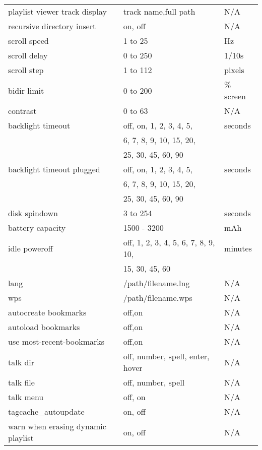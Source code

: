 \begin{center}
\begin{longtable}{@{}lll@{}}
    playlist viewer track display & track name,full path & N/A\\
    recursive directory insert & on, off & N/A\\
    scroll speed & 1 to 25 & Hz\\
    scroll delay & 0 to 250 & 1/10s\\
    scroll step & 1 to 112 & pixels\\
    bidir limit & 0 to 200 & \% screen\\
    contrast & 0 to 63 & N/A\\
    backlight timeout & off, on, 1, 2, 3, 4, 5, & seconds\\
                      & 6, 7, 8, 9, 10, 15, 20, & \\
                      & 25, 30, 45, 60, 90 & \\
    backlight timeout plugged & off, on, 1, 2, 3, 4, 5, & seconds\\
                              & 6, 7, 8, 9, 10, 15, 20, & \\
                              & 25, 30, 45, 60, 90 & \\
    disk spindown & 3 to 254 & seconds\\
    battery capacity & 1500 - 3200 & mAh\\
    idle poweroff & off, 1, 2, 3, 4, 5, 6, 7, 8, 9, 10, & minutes\\
                  & 15, 30, 45, 60 & \\
    lang & /path/filename.lng & N/A\\
    wps & /path/filename.wps & N/A\\
    autocreate bookmarks & off,on & N/A\\
    autoload bookmarks & off,on & N/A\\
    use most-recent-bookmarks & off,on & N/A\\
    talk dir & off, number, spell, enter, hover & N/A\\
    talk file & off, number, spell & N/A\\
    talk menu & off, on & N/A\\
    tagcache\_autoupdate & on, off & N/A\\
    warn when erasing dynamic playlist & on, off & N/A\\
    

\end{longtable}
\end{center}
